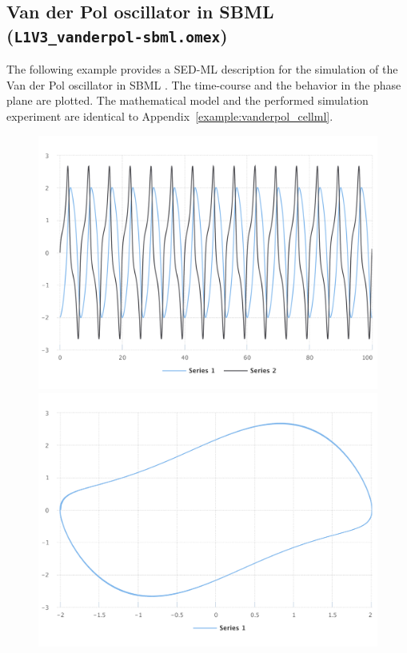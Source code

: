 \subsection{Van der Pol oscillator in SBML (\texttt{L1V3\_vanderpol-sbml.omex})}
\label{example:vanderpol_sbml}
The following example provides a SED-ML description for the simulation of the Van der Pol oscillator in SBML \citep{Hucka:2003}. The time-course and the behavior in the phase plane are plotted. The mathematical model and the performed simulation experiment are identical to Appendix~\ref{example:vanderpol_cellml}.

\begin{figure}[ht]
    \centering
    \begin{minipage}{0.47\textwidth}
        \centering
        \includegraphics[width=1.0\textwidth]{examples/vanderpol-sbml/results/sedml_webtools/plot1}
        \includegraphics[width=1.0\textwidth]{examples/vanderpol-sbml/results/sedml_webtools/plot2}

\end{minipage}
\end{figure}
